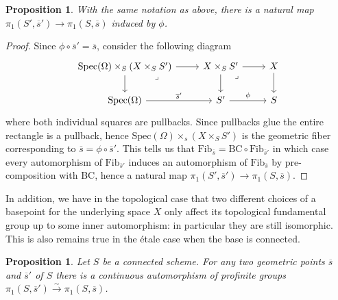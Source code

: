 \documentclass{article}
\theoremstyle{definition}
\theoremstyle{remark}
\theoremstyle{plain}
\newtheorem{proposition}[theorem]{Proposition}
\begin{document}
\begin{proposition}
	With the same notation as above, there is a natural map $\pi_1(S', \overline{s}') \to \pi_1(S, \overline{s})$ induced by $\phi$.
\end{proposition}

\begin{proof}
Since $\phi \circ \overline{s}' = \overline{s}$, consider the following diagram 
\[\begin{tikzcd}
	{\text{Spec}(\Omega) \times_S (X \times _S S')} & {X\times_S S'} & X \\
	{\text{Spec}(\Omega)} & {S'} & S
	\arrow[from=1-1, to=1-2]
	\arrow[from=1-1, to=2-1]
	\arrow["\lrcorner"{anchor=center, pos=0.125}, draw=none, from=1-1, to=2-2]
	\arrow[from=1-2, to=1-3]
	\arrow[from=1-2, to=2-2]
	\arrow["\lrcorner"{anchor=center, pos=0.125}, draw=none, from=1-2, to=2-3]
	\arrow[from=1-3, to=2-3]
	\arrow["{\overline{s}'}", from=2-1, to=2-2]
	\arrow["\phi", from=2-2, to=2-3]
\end{tikzcd}\]
 where both individual squares are pullbacks. 
 Since pullbacks glue the entire rectangle is a pullback, hence $\text{Spec}(\Omega) \times_s (X \times_S S')$ is the geometric fiber corresponding to $\overline{s} = \phi \circ \overline{s}'$.
This tells us that $\text{Fib}_{\overline{s}} = \text{BC} \circ \text{Fib}_{\overline{s}'}$ in which case every automorphism of $\text{Fib}_{\overline{s}'}$ induces an automorphism of $\text{Fib}_{\overline{s}}$ by pre-composition with BC, hence a natural map $\pi_1(S', \overline{s}') \to \pi_1(S, \overline{s})$.
\end{proof}

In addition, we have in the topological case that two different choices of a basepoint for the underlying space $X$ only affect its topological fundamental group up to some inner automorphism: in particular they are still isomorphic.
This is also remains true in the \'etale case when the base is connected.

\begin{proposition}
	Let $S$ be a connected scheme.
	For any two geometric points $\overline{s}$ and $\overline{s}'$ of $S$ there is a continuous automorphism of profinite groups $\pi_1(S, \overline{s}') \xrightarrow{\sim} \pi_1(S, \overline{s})$. 
\end{proposition}
\end{document}
